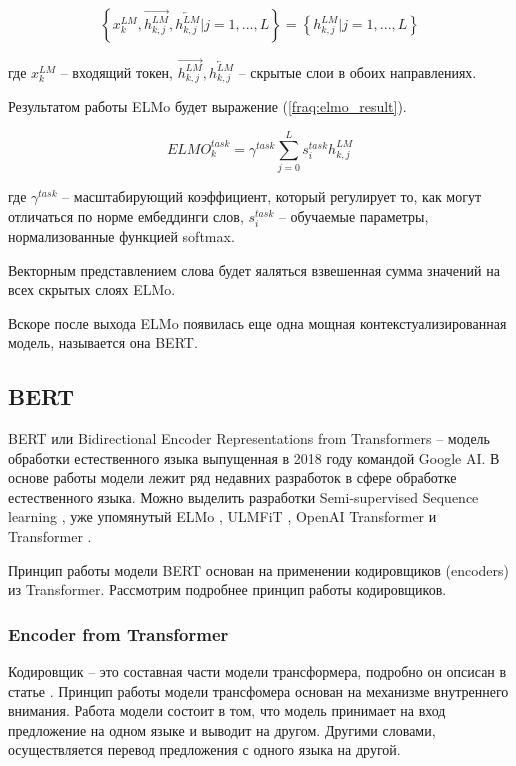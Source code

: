 \documentclass[a4paper,14pt]{article}
\begin{document}
\begin{equation}
	\left\{ x_k^{LM}, \overrightarrow{h_{k,j}^{LM}}, \overleftarrow{h_{k,j}^{LM}}  |j = 1, ...,L\right\} = 
	\left\{h_{k,j}^{LM}|j = 1, ...,L
	\right\}
	\label{fraq:array_elmo}
\end{equation}

где $x_k^{LM}$ -- входящий токен, $\overrightarrow{h_{k,j}^{LM}}, \overleftarrow{h_{k,j}^{LM}}$ -- скрытые слои в обоих направлениях.

Результатом работы ELMo будет выражение (\ref{fraq:elmo_result}).

\begin{equation}
	ELMO_k^{task} = \gamma^{task}\sum_{j=0}^{L} s_{i}^{task}h_{k,j}^{LM}
	\label{fraq:elmo_result}
\end{equation}

где $\gamma^{task}$ -- масштабирующий коэффициент, который регулирует то, как могут отличаться по норме ембеддинги слов, $s_{i}^{task}$ -- обучаемые параметры, нормализованные функцией softmax.

Векторным представлением слова будет яаляться взвешенная сумма значений на всех скрытых слоях ELMo.

Вскоре после выхода ELMo появилась еще одна мощная контекстуализированная модель, называется она BERT.

\subsection{BERT}

BERT \cite{bert1} или Bidirectional Encoder Representations from Transformers -- модель обработки естественного языка выпущенная в 2018 году командой Google AI.
В основе работы модели лежит ряд недавних разработок в сфере обработке естественного языка.
Можно выделить разработки Semi-supervised Sequence learning \cite{semi}, уже упомянутый ELMo \cite{elmo1,elmo2,elmo3}, ULMFiT \cite{ulmfit}, OpenAI Transformer \cite{transformers} и Transformer \cite{attention}.

Принцип работы модели BERT основан на применении кодировщиков (encoders) из Transformer.
Рассмотрим подробнее принцип работы кодировщиков.

\subsubsection{Encoder from Transformer}

Кодировщик -- это составная части модели трансформера, подробно он опсисан в статье \cite{attention}.
Принцип работы модели трансфомера основан на механизме внутреннего внимания.
Работа модели состоит в том, что модель принимает на вход предложение на одном языке и выводит на другом.
Другими словами, осуществляется перевод предложения с одного языка на другой.
\end{document}
